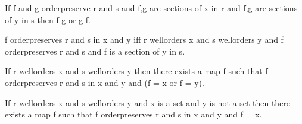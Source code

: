 \documentclass[a4paper,draft]{amsproc}
\begin{document}
\begin{forthel}
\begin{theorem}[97]
If f and g orderpreserve r and s and \domain f,\domain g are sections of x in r
and \range f,\range g are sections of y in s then f \subset g or g \subset f.
\end{theorem}

\begin{definition}[98]
f orderpreserves r and s in x and y iff r wellorders x and s wellorders y and
f orderpreserves r and s and \domain f is a section of y in s.
\end{definition}

\begin{theorem}[99]
If r wellorders x and s wellorders y then there exists a map f such that
f orderpreserves r and s in x and y and (\domain f = x or \range f = y).
\end{theorem}

\begin{theorem}[100]
If r wellorders x and s wellorders y and x is a set and y is not a set
then there exists a %
 map f such that f orderpreserves r and s in x and y
and \domain f = x.
\end{theorem}

\end{forthel}
\end{document}
